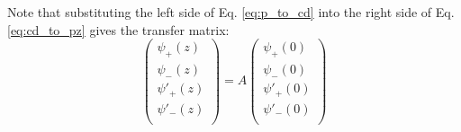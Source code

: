 \documentclass[%
 reprint,
 amsmath,
 amssymb,
 aps,
 prl,
 lengthcheck,%
]{revtex4-1}
\begin{document}
Note that substituting the left side of Eq. \ref{eq:p_to_cd} into 
the right side of Eq. \ref{eq:cd_to_pz}
gives the transfer matrix: 
\begin{equation}
  \begin{pmatrix}
    \psi_{+}(z) \\
    \psi_{-}(z) \\
    \psi'_{+}(z) \\
    \psi'_{-}(z) \\
  \end{pmatrix}
  = 
  A
  \begin{pmatrix}
    \psi_{+}(0) \\
    \psi_{-}(0) \\
    \psi'_{+}(0) \\
    \psi'_{-}(0) \\
  \end{pmatrix}
\end{equation}
\end{document}

